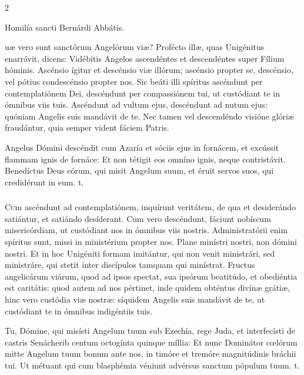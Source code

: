\documentclass[9pt,twoside]{extarticle}
\begin{document}
\begin{multicols}{2}
\begin{center}Homilía sancti Bernárdi Abbátis.\\
\end{center}
uæ vero sunt sanctórum Angelórum viæ? Profécto illæ, quas Unigénitus enarrávit, dicens: Vidébitis Angelos ascendéntes et descendéntes super Fílium hóminis. Ascénsio ígitur et descénsio viæ illórum; ascénsio propter se, descénsio, vel pótius condescénsio propter nos. Sic beáti illi spíritus ascéndunt per contemplatiónem Dei, descéndunt per compassiónem tui, ut custódiant te in ómnibus viis tuis. Ascéndunt ad vultum ejus, descéndunt ad nutum ejus: quóniam Angelis suis mandávit de te. Nec tamen vel descendéndo visióne glóriæ fraudántur, quia semper vident fáciem Patris.

\begin{tightlist}{}
\item {} Angelus Dómini descéndit cum Azaría et sóciis ejus in fornácem, et excússit flammam ignis de fornáce: \textred{*} Et non tétigit eos omníno ignis, neque contristávit.  Benedíctus Deus eórum, qui misit Angelum suum, et éruit servos suos, qui credidérunt in eum. t.
\end{tightlist}

\subsubsection*{\center {}}
\lettrine{C}um ascéndunt ad contemplatiónem, inquírunt veritátem, de qua et desiderándo satiántur, et satiándo desíderant. Cum vero descéndunt, fáciunt nobíscum misericórdiam, ut custódiant nos in ómnibus viis nostris. Administratórii enim spíritus sunt, missi in ministérium propter nos. Plane minístri nostri, non dómini nostri. Et in hoc Unigéniti formam imitántur, qui non venit ministrári, sed ministráre, qui stetit inter discípulos tamquam qui minístrat. Fructus angelicárum viárum, quod ad ipsos spectat, sua ipsórum beatitúdo, et obediéntia est caritátis: quod autem ad nos pértinet, inde quidem obténtus divínæ grátiæ, hinc vero custódia viæ nostræ: síquidem Angelis suis mandávit de te, ut custódiant te in ómnibus indigéntiis tuis.

\begin{tightlist}{}
\item {} Tu, Dómine, qui misísti Angelum tuum sub Ezechía, rege Juda, et interfecísti de castris Senácherib centum octogínta quinque míllia: \textred{*} Et nunc Dominátor cœlórum mitte Angelum tuum bonum ante nos, in timóre et tremóre magnitúdinis bráchii tui.  Ut métuant qui cum blasphémia véniunt advérsus sanctum pópulum tuum. t.
\end{tightlist}


\end{multicols}
\end{document}
